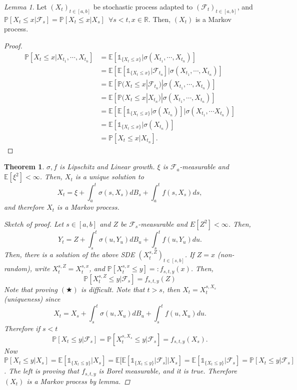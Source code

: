 \documentclass[12pt]{report}
\newcommand{\R}{\mathbb{R}}
\renewcommand{\P}{\mathbb{P}}
\newcommand{\F}{\mathcal{F}}
\newcommand{\E}{\mathbb{E}}
\renewcommand{\1}{\mathbb{1}}
\theoremstyle{break}
\newtheorem{thm}{Theorem}[section] %
\theoremstyle{newdef}
\theoremstyle{remark}
\newtheorem*{lem}{Lemma}
\begin{document}
\begin{lem}
Let $(X_t)_{t\in[a,b]}$ be stochastic process adapted to $(\F_t)_{t\in[a,b]}$, and
$\P[X_t \leq x | \F_s] = \P[X_t \leq x | X_s] \enspace \forall s < t, x \in \R$.
Then, $(X_t)$ is a Markov process.

\begin{proof}
\[
\begin{aligned}
\P\left[X_t \leq x | X_{t_1}, \cdots, X_{t_n}\right]
&= \E[\1_{\{X_t \leq x\}} | \sigma(X_{t_1}, \cdots, X_{t_n})]\\
&= \E\left[\E\left[\1_{\{X_t \leq x\}} | \F_{t_n}\right] | \sigma(X_{t_1}, \cdots, X_{t_n})\right]\\
&= \E[\P(X_t \leq x | \F_{t_n}) | \sigma(X_{t_1}, \cdots, X_{t_n})]\\
&= \E[\P(X_t \leq x | X_{t_n}) | \sigma(X_{t_1}, \cdots, X_{t_n})]\\
&= \E\left[\E\left[\1_{\{X_t \leq x\}} | \sigma(X_{t_n})\right] | \sigma(X_{t_1}, \cdots X_{t_n})\right]\\
&= \E\left[ \1_{\{X_t \leq x\}} | \sigma(X_{t_n})\right]\\
&= \P[X_t \leq x | X_{t_n}].
\end{aligned}
\]
\end{proof}
\end{lem}

\begin{thm}
$\sigma, f$ is Lipschitz and Linear growth.
$\xi$ is $\F_a$-measurable and $\E[\xi^2] < \infty$.
Then, $X_t$ is a unique solution to
\[X_t = \xi + \int_a^t \sigma(s,X_s)dB_s + \int_a^t f(s,X_s)ds,\]
and therefore $X_t$ is a Markov process.

\begin{proof}[Sketch of proof]
Let $s \in [a,b]$ and $Z$ be $\F_s$-measurable and $E[Z^2] < \infty$.
Then,
\[Y_t = Z + \int_s^t \sigma(u,Y_u)dB_u + \int_s^t f(u,Y_u) du.\]
Then, there is a solution of the above SDE $\left(X_t^{s,Z}\right)_{t\in[s,b]}$.
If $Z = x$ (non-random), write $X_t^{s,Z} = X_{t}^{s,x}$, and
$\P[X_t^{s,x} \leq y] =: f_{s,t,y}(x)$.
Then,
\begin{equation}
\P\left[X_t^{s,Z} \leq y | \F_s \right] = f_{s,t,y}(Z)\tag{$\bigstar$}
\end{equation}
Note that proving $(\bigstar)$ is difficult.
Note that $t > s$, then $X_t = X_t^{s,X_s}$ (uniqueness) since
\[X_t = X_s + \int_s^t \sigma(u, X_u)dB_u + \int_s^t f(u,X_u)du.\]
Therefore if $s < t$
\[\P[X_t \leq y | \F_s] = \P[X_t^{s,X_s} \leq y | \F_s] = f_{s,t,y}(X_s).\]
Now $\P[X_t \leq y | X_s] = \E[\1_{\{X_t \leq y\}} | X_s] = \E[\E[\1_{\{X_t \leq y\}} | \F_s] | X_s] = \E[\1_{\{X_t \leq y\}} | \F_s] = \P[X_t \leq y | \F_s]$.
The left is proving that $f_{s,t,y}$ is Borel measurable, and it is true.
Therefore $(X_t)$ is a Markov process by lemma.
\end{proof}
\end{thm}
\end{document}
